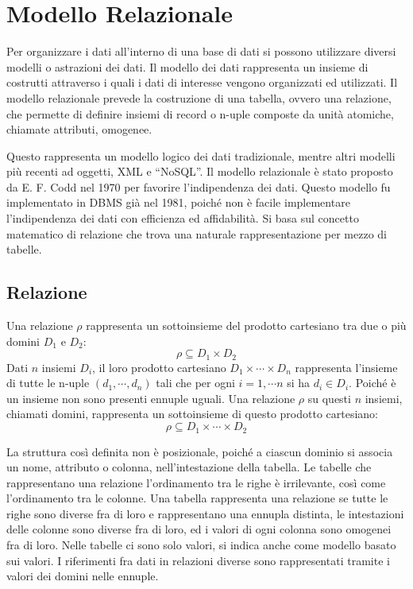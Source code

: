 \documentclass{article}
\numberwithin{equation}{subsection}
\begin{document}
\clearpage

\section{Modello Relazionale}

Per organizzare i dati all'interno di una base di dati si possono utilizzare diversi modelli o astrazioni dei dati. Il modello dei dati rappresenta un insieme di costrutti 
attraverso i quali i dati di interesse vengono organizzati ed utilizzati. Il modello relazionale prevede la costruzione di una tabella, ovvero una relazione, che 
permette di definire insiemi di record o n-uple composte da unità atomiche, chiamate attributi, omogenee. 

Questo rappresenta un modello logico dei dati tradizionale, mentre altri modelli più recenti ad oggetti, XML e ``NoSQL''. 
Il modello relazionale è stato proposto da E. F. Codd nel 1970 per favorire l'indipendenza dei dati. Questo modello fu implementato in DBMS già nel 1981, poiché non è 
facile implementare l'indipendenza dei dati con efficienza ed affidabilità. Si basa sul concetto matematico di relazione che trova una naturale rappresentazione per 
mezzo di tabelle. 

\subsection{Relazione}

Una relazione $\rho$ rappresenta un sottoinsieme del prodotto cartesiano tra due o più domini $D_1$ e $D_2$:
\begin{equation*}
    \rho\subseteq D_1\times D_2
\end{equation*}
Dati $n$ insiemi $D_i$, il loro prodotto cartesiano $D_1\times\cdots\times D_n$ rappresenta l'insieme di tutte le n-uple $(d_1,\cdots,d_n)$ tali che per ogni $i=1,\cdots n$ 
si ha $d_i\in D_i$. Poiché è un insieme non sono presenti ennuple uguali. Una relazione $\rho$ su questi $n$ insiemi, chiamati domini, rappresenta un sottoinsieme 
di questo prodotto cartesiano:
\begin{equation}
    \rho\subseteq D_1\times\cdots\times D_2
\end{equation}

La struttura così definita non è posizionale, poiché a ciascun dominio si associa un nome, attributo o colonna, nell'intestazione della tabella. 
Le tabelle che rappresentano una relazione l'ordinamento tra le righe è irrilevante, così come l'ordinamento tra le colonne. 
Una tabella rappresenta una relazione se tutte le righe sono diverse fra di loro e rappresentano una ennupla distinta, le intestazioni delle colonne sono diverse 
fra di loro, ed i valori di ogni colonna sono omogenei fra di loro. 
Nelle tabelle ci sono solo valori, si indica anche come modello basato sui valori. I riferimenti fra dati in relazioni diverse sono rappresentati tramite i valori 
dei domini nelle ennuple. 
\end{document}
